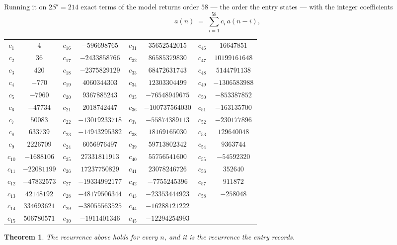 \documentclass[11pt,a4paper]{article}
\theoremstyle{plain}
\newtheorem{theorem}{Theorem}
\theoremstyle{definition}
\begin{document}
Running it on $2S'=214$ exact terms of the model returns order $58$ --- the order the
entry states --- with the integer coefficients
\[
a(n)\;=\;\sum_{i=1}^{58}c_i\,a(n-i),
\]
\begin{center}\small
\begin{tabular}{cccccccc}
$c_{1}$ & $4$ & $c_{16}$ & $-596698765$ & $c_{31}$ & $35652542015$ & $c_{46}$ & $16647851$ \\
$c_{2}$ & $36$ & $c_{17}$ & $-2433858766$ & $c_{32}$ & $86585379830$ & $c_{47}$ & $10199161648$ \\
$c_{3}$ & $420$ & $c_{18}$ & $-2375829129$ & $c_{33}$ & $68472631743$ & $c_{48}$ & $5144791138$ \\
$c_{4}$ & $-770$ & $c_{19}$ & $4060344303$ & $c_{34}$ & $12303304499$ & $c_{49}$ & $-1306583988$ \\
$c_{5}$ & $-7960$ & $c_{20}$ & $9367885243$ & $c_{35}$ & $-76548949675$ & $c_{50}$ & $-853387852$ \\
$c_{6}$ & $-47734$ & $c_{21}$ & $2018742447$ & $c_{36}$ & $-100737564030$ & $c_{51}$ & $-163135700$ \\
$c_{7}$ & $50083$ & $c_{22}$ & $-13019233718$ & $c_{37}$ & $-55874389113$ & $c_{52}$ & $-230177896$ \\
$c_{8}$ & $633739$ & $c_{23}$ & $-14943295382$ & $c_{38}$ & $18169165030$ & $c_{53}$ & $129640048$ \\
$c_{9}$ & $2226709$ & $c_{24}$ & $6056976497$ & $c_{39}$ & $59713802342$ & $c_{54}$ & $9363744$ \\
$c_{10}$ & $-1688106$ & $c_{25}$ & $27331811913$ & $c_{40}$ & $55756541600$ & $c_{55}$ & $-54592320$ \\
$c_{11}$ & $-22081199$ & $c_{26}$ & $17237750829$ & $c_{41}$ & $23078246726$ & $c_{56}$ & $352640$ \\
$c_{12}$ & $-47832573$ & $c_{27}$ & $-19334992177$ & $c_{42}$ & $-7755245396$ & $c_{57}$ & $911872$ \\
$c_{13}$ & $42148192$ & $c_{28}$ & $-48179506344$ & $c_{43}$ & $-23353444923$ & $c_{58}$ & $-258048$ \\
$c_{14}$ & $334693621$ & $c_{29}$ & $-38055563525$ & $c_{44}$ & $-16288121222$ &  &  \\
$c_{15}$ & $506780571$ & $c_{30}$ & $-1911401346$ & $c_{45}$ & $-12294254993$ &  &  \\
\end{tabular}
\end{center}

\begin{theorem}
The recurrence above holds for every $n$, and it is the recurrence the entry records.
\end{theorem}
\end{document}
